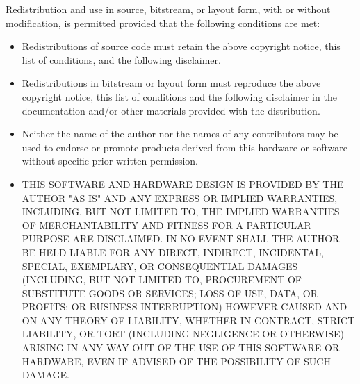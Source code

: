 \documentclass{article}
\begin{document}
Redistribution and use in source, bitstream, or layout form, with or without modification, is permitted
provided that the following conditions are met:

\begin{itemize}
\item Redistributions of source code must retain the above copyright notice, this list of conditions, and the following
disclaimer.

\item Redistributions in bitstream or layout form must reproduce the above copyright notice, this list of conditions and
the following disclaimer in the documentation and/or other materials provided with the distribution.

\item Neither the name of the author nor the names of any contributors may be used to endorse or promote products
derived from this hardware or software without specific prior written permission.

\item THIS SOFTWARE AND HARDWARE DESIGN IS PROVIDED BY THE AUTHOR "AS IS" AND ANY EXPRESS OR IMPLIED WARRANTIES, 
INCLUDING, BUT NOT LIMITED TO, THE IMPLIED WARRANTIES OF MERCHANTABILITY AND FITNESS FOR A PARTICULAR PURPOSE ARE 
DISCLAIMED. IN NO EVENT SHALL THE AUTHOR BE HELD LIABLE FOR ANY DIRECT, INDIRECT, INCIDENTAL, SPECIAL, EXEMPLARY, OR 
CONSEQUENTIAL DAMAGES (INCLUDING, BUT NOT LIMITED TO, PROCUREMENT OF SUBSTITUTE GOODS OR SERVICES; LOSS OF USE, 
DATA, OR PROFITS; OR BUSINESS INTERRUPTION) HOWEVER CAUSED AND ON ANY THEORY OF LIABILITY, WHETHER IN CONTRACT, 
STRICT LIABILITY, OR TORT (INCLUDING NEGLIGENCE OR OTHERWISE) ARISING IN ANY WAY OUT OF THE USE OF THIS SOFTWARE OR 
HARDWARE, EVEN IF ADVISED OF THE POSSIBILITY OF SUCH DAMAGE.

\end{itemize}
\end{document}
